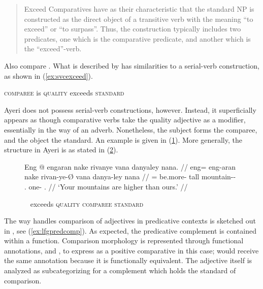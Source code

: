 \blockcquote{wals121}{Exceed Comparatives have as their characteristic that the
standard NP is constructed as the direct object of a transitive verb with the
meaning \enquote{to exceed} or \enquote{to surpass}. Thus, the construction
typically includes two predicates, one which is the comparative predicate, and
another which is the \enquote{exceed}-verb.}

Also compare \citet{beermannetal2005}. What is described by \citet{wals121} has
similarities to a serial-verb construction, as shown in (\ref{ex:svcexceed}).

\ex\label{ex:svcexceed}
	\textsc{comparee} is \textsc{quality} exceeds \textsc{standard}
\xe

Ayeri does not possess serial-verb constructions, however. Instead, it
superficially appears as though comparative verbs take the quality adjective as
a modifier, essentially in the way of an adverb. Nonetheless, the subject forms
the comparee, and the object the standard. An example is given in
(\ref{ex:ayrexceed}). More generally, the structure in Ayeri is as stated in
(\ref{ex:ayrexceedscheme}).

\begin{figure}
\ex\label{ex:ayrexceed}\begingl
	\gla Eng @ engaran nake rivanye vana danyaley nana. //
	\glb eng= eng-aran nake rivan-ye-Ø vana danya-ley nana //
	\glc \AgtTI{}= be.more-\TplI{} tall mountain-\Pl{}-\Top{} \Second{}.\Gen{}
		one-\PargI{} \Fpl{}.\Gen{} //
	\glft `Your mountains are higher than ours.' //
\endgl
\xe
\end{figure}

\begin{figure}
\ex~\label{ex:ayrexceedscheme}%
	exceeds \textsc{quality} \textsc{comparee} \textsc{standard}
\xe
\end{figure}

The way \Lfg{} handles comparison of adjectives in predicative contexts is
sketched out in \citet[122]{butt1999}, see (\ref{ex:lfgpredcomp}). As expected,
the predicative complement is contained within a \Plink{} function. Comparison
morphology is represented through functional annotations, \Deg{} and \Degdim{},
to express  as a positive comparative in this case; 
would receive the same annotation because it is functionally equivalent. The
adjective itself is analyzed as subcategorizing for a complement which holds
the standard of comparison.

